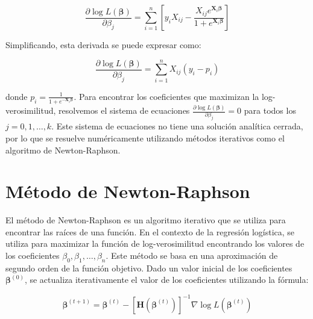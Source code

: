 \begin{equation}
\frac{\partial \log L(\boldsymbol{\beta})}{\partial \beta_j} = \sum_{i=1}^{n} \left[ y_i X_{ij} - \frac{X_{ij} e^{\mathbf{X}_i \boldsymbol{\beta}}}{1 + e^{\mathbf{X}_i \boldsymbol{\beta}}} \right]
\end{equation}

Simplificando, esta derivada se puede expresar como:

\begin{equation}
\frac{\partial \log L(\boldsymbol{\beta})}{\partial \beta_j} = \sum_{i=1}^{n} X_{ij} (y_i - p_i)
\end{equation}

donde $p_i = \frac{1}{1 + e^{-\mathbf{X}_i \boldsymbol{\beta}}}$. Para encontrar los coeficientes que maximizan la log-verosimilitud, resolvemos el sistema de ecuaciones $\frac{\partial \log L(\boldsymbol{\beta})}{\partial \beta_j} = 0$ para todos los $j = 0, 1, \ldots, k$. Este sistema de ecuaciones no tiene una solución analítica cerrada, por lo que se resuelve numéricamente utilizando métodos iterativos como el algoritmo de Newton-Raphson.

\section{Método de Newton-Raphson}

El método de Newton-Raphson es un algoritmo iterativo que se utiliza para encontrar las raíces de una función. En el contexto de la regresión logística, se utiliza para maximizar la función de log-verosimilitud encontrando los valores de los coeficientes $\beta_0, \beta_1, \ldots, \beta_n$. Este m\'etodo se basa en una aproximación de segundo orden de la función objetivo. Dado un valor inicial de los coeficientes $\boldsymbol{\beta}^{(0)}$, se actualiza iterativamente el valor de los coeficientes utilizando la fórmula:

\begin{equation}
\boldsymbol{\beta}^{(t+1)} = \boldsymbol{\beta}^{(t)} - \left[ \mathbf{H}(\boldsymbol{\beta}^{(t)}) \right]^{-1} \nabla \log L(\boldsymbol{\beta}^{(t)})
\end{equation}


